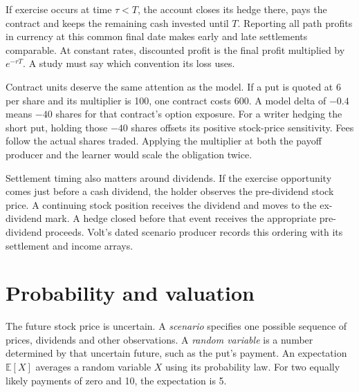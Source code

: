 \documentclass[8pt]{strategynet-journal}
\newcommand{\E}{\mathbb{E}}
\begin{document}
\begin{SNcolumns}
If exercise occurs at time $\tau<T$, the account closes its hedge there,
pays the contract and keeps the remaining cash invested until $T$. Reporting
all path profits in currency at this common final date makes early and late
settlements comparable. At constant rates, discounted profit is the final
profit multiplied by $e^{-rT}$. A study must say which convention its loss uses.

\begin{center}\begin{minipage}{\linewidth}\centering
{}
\end{minipage}\end{center}

Contract units deserve the same attention as the model. If a put is quoted
at 6 per share and its multiplier is 100, one contract costs 600. A model
delta of $-0.4$ means $-40$ shares for that contract's option exposure. For a
writer hedging the short put, holding those $-40$ shares offsets its positive
stock-price sensitivity. Fees follow the actual shares traded. Applying the
multiplier at both the payoff producer and the learner would scale the
obligation twice.

Settlement timing also matters around dividends. If the exercise opportunity
comes just before a cash dividend, the holder observes the pre-dividend stock
price. A continuing stock position receives the dividend and moves to the
ex-dividend mark. A hedge closed before that event receives the appropriate
pre-dividend proceeds. Volt's dated scenario producer records this ordering
with its settlement and income arrays.

\section{Probability and valuation}
The future stock price is uncertain. A \emph{scenario} specifies one possible
sequence of prices, dividends and other observations. A \emph{random variable}
is a number determined by that uncertain future, such as the put's payment.
An expectation $\E[X]$ averages a random variable $X$ using its probability law.
For two equally likely payments of zero and 10, the expectation is 5.


\end{SNcolumns}
\end{document}
